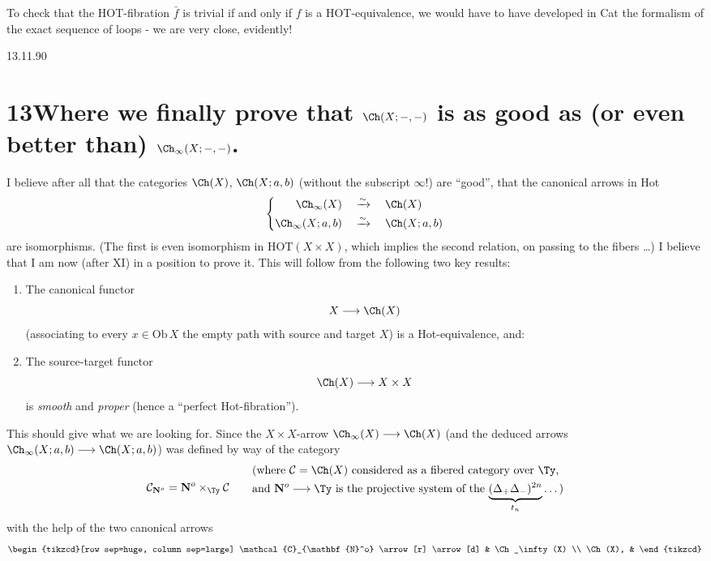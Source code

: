 To check that the HOT-fibration $\bar f$ is trivial if and only if $f$ is a HOT-equivalence, we would have to have developed in Cat the formalism of the exact sequence of loops - we are very close, evidently!


\begin{flushright}
\footnotesize 13.11.90
\end{flushright}

\section*{13\quad Where we finally prove that $\Ch(X;-,-)$ is as good as (or even better than) $\Ch_\infty(X;-,-)$.}

I believe after all that the categories $\Ch(X)$, $\Ch(X;a,b)$ (without the subscript $\infty$!) are ``good'', that the canonical arrows in Hot
\[
\left\{
\begin{aligned}
\Ch_\infty(X) \quad &\xrightarrow{\sim} \quad \Ch(X)\\
\Ch_\infty(X;a,b) \quad &\xrightarrow{\sim} \quad \Ch(X;a,b)
\end{aligned}
\right.
\]
are isomorphisms. (The first is even isomorphism in $\mathrm{HOT}(X \times X)$, which implies the second relation, on passing to the fibers \dots) I believe that I am now (after XI) in a position to prove it. This will follow from the following two key results:

\begin{enumerate}
\item[1)] The canonical functor
\[
X \longrightarrow \Ch(X)
\]
(associating to every $x \in \mathrm{Ob}\,X$ the empty path with source and target $X$) is a Hot-equivalence, and: %
\item[2)] The source-target functor
\[
\Ch(X) \longrightarrow X \times X
\]
is \textit{smooth} and \textit{proper} (hence a ``perfect Hot-fibration'').
\end{enumerate}

This should give what we are looking for. Since the $X \times X$-arrow $\Ch_\infty(X) \longrightarrow \Ch(X)$ (and the deduced arrows $\Ch_\infty(X;a,b) \longrightarrow \Ch(X;a,b)$) was defined by way of the category
\[
\mathcal{C}_{\mathbf{N}^o} = \mathbf{N}^o \times_{\Ty} \mathcal{C}
\qquad
\begin{aligned}
&\text{(where $\mathcal{C} = \Ch(X)$ considered as a fibered category over $\Ty$,}\\
&\text{and $\mathbf{N}^o \longrightarrow \Ty$ is the projective system of the $\underbrace{(\Delta_+\Delta_-)^{2n}}_{t_n} \dots$)}
\end{aligned}
\]
with the help of the two canonical arrows
\[
\begin{tikzcd}[row sep=huge, column sep=large]
\mathcal{C}_{\mathbf{N}^o} \arrow[r] \arrow[d] & \Ch_\infty(X) \\
\Ch(X), &
\end{tikzcd}
\]

